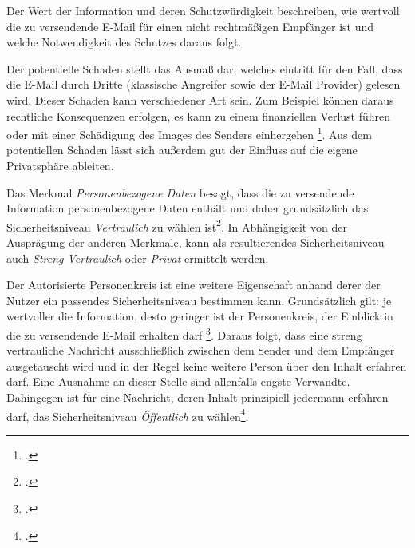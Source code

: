 \documentclass  [paper=a4,
				fontsize=12pt,
				listof=totoc,
				bibliography=totoc
				]{scrreprt}
\begin{document}
		Der Wert der Information und deren Schutzwürdigkeit beschreiben, wie wertvoll die zu versendende E-Mail für einen nicht rechtmäßigen Empfänger ist und welche Notwendigkeit des Schutzes daraus folgt.
		
		Der potentielle Schaden stellt das Ausmaß dar, welches eintritt für den Fall, dass die E-Mail durch 
		Dritte (klassische Angreifer sowie der E-Mail Provider) gelesen wird. Dieser Schaden kann verschiedener Art sein. Zum Beispiel können daraus rechtliche Konsequenzen erfolgen, es kann zu einem finanziellen Verlust führen oder mit einer Schädigung des Images des Senders einhergehen \footcite[Vgl.][S. 6]{Reinhausen GmbH}. Aus dem potentiellen Schaden lässt sich außerdem gut der Einfluss auf die eigene Privatsphäre ableiten.
		
		
		Das Merkmal \textit{Personenbezogene Daten} besagt, dass die zu versendende Information personenbezogene Daten enthält und daher grundsätzlich das Sicherheitsniveau \textit{Vertraulich} zu wählen ist\footcite[Vgl.][]{TSE}.	In Abhängigkeit von der Ausprägung der anderen Merkmale, kann als resultierendes Sicherheitsniveau auch \textit{Streng Vertraulich} oder \textit{Privat} ermittelt werden.
		
		
		Der Autorisierte Personenkreis ist eine weitere Eigenschaft anhand derer der Nutzer ein passendes Sicherheitsniveau bestimmen kann. Grundsätzlich gilt: je wertvoller die Information, desto geringer ist der Personenkreis, der Einblick in die zu versendende E-Mail erhalten darf \footcite[Vgl.][]{TSE}. Daraus folgt, dass eine streng vertrauliche Nachricht ausschließlich zwischen dem Sender und dem Empfänger ausgetauscht wird und in der Regel keine weitere Person über den Inhalt erfahren darf. Eine Ausnahme an dieser Stelle sind allenfalls engste Verwandte. Dahingegen ist für eine Nachricht, deren Inhalt prinzipiell jedermann erfahren darf, das Sicherheitsniveau \textit{Öffentlich} zu wählen\footcite[Vgl.][]{Reinhausen GmbH, S. 10}.
		
\end{document}
